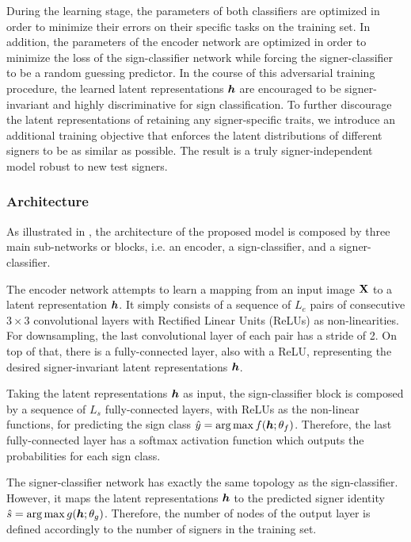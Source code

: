 During the learning stage, the parameters of both classifiers are optimized in order to minimize their errors on their specific tasks on the training set. In addition, the parameters of the encoder network are optimized in order to minimize the loss of the sign-classifier network while forcing the signer-classifier to be a random guessing predictor. In the course of this adversarial training procedure, the learned latent representations ${\bm{h}}$ are encouraged to be signer-invariant and highly discriminative for sign classification. To further discourage the latent representations of retaining any signer-specific traits, we introduce an additional training objective that enforces the latent distributions of different signers to be as similar as possible. The result is a truly signer-independent model robust to new test signers.

\subsubsection{Architecture}
As illustrated in , the architecture of the proposed model is composed by three main sub-networks or blocks, i.e. an encoder, a sign-classifier, and a signer-classifier.

The encoder network attempts to learn a mapping from an input image ${\mathbf{X}}$ to a latent representation ${\bm{h}}$. It simply consists of a sequence of $L_{e}$ pairs of consecutive $3\times 3$ convolutional layers with Rectified  Linear  Units (ReLUs) as non-linearities. For downsampling, the last convolutional layer of each pair has a stride of 2. On top of that, there is a fully-connected layer, also with a ReLU, representing the desired signer-invariant latent representations ${\bm{h}}$.

Taking the latent representations ${\bm{h}}$ as input, the sign-classifier block is composed by a sequence of $L_{s}$ fully-connected layers, with ReLUs as the non-linear functions, for predicting the sign class $\hat{y}=\operatorname*{arg\,max} f({\bm{h}}; \theta_f)$. Therefore, the last fully-connected layer has a softmax activation function which outputs the probabilities for each sign class.

The signer-classifier network has exactly the same topology as the sign-classifier. However, it maps the latent representations ${\bm{h}}$ to the predicted signer identity $\hat{s}=\operatorname*{arg\,max} g({\bm{h}}; \theta_g)$. Therefore, the number of nodes of the output layer is defined accordingly to the number of signers in the training set.

